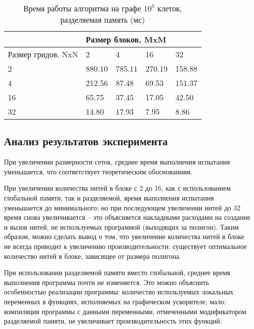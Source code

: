 \documentclass[a4paper, 12pt]{article}
\begin{document}
\clearpage
    \begin{table}[h!]
    \centering
\begin{tabular}{|l|llll|}
\hline
 & \multicolumn{4}{l|}{Размер блоков, MxM} \\ \hline
Размер гридов, NxN & \multicolumn{1}{l|}{2} & \multicolumn{1}{l|}{4} & \multicolumn{1}{l|}{16} & 32 \\ \hline
2 & \multicolumn{1}{l|}{880.10} & \multicolumn{1}{l|}{785.11} & \multicolumn{1}{l|}{270.19} & 158.88 \\ \hline
4 & \multicolumn{1}{l|}{212.56} & \multicolumn{1}{l|}{87.48} & \multicolumn{1}{l|}{69.53} & 151.37 \\ \hline
16 & \multicolumn{1}{l|}{65.75} & \multicolumn{1}{l|}{37.45} & \multicolumn{1}{l|}{17.05} & 42.50 \\ \hline
32 & \multicolumn{1}{l|}{14.80} & \multicolumn{1}{l|}{17.93} & \multicolumn{1}{l|}{7.95} & 8.86 \\ \hline
\end{tabular}
\caption{Время работы алгоритма на графе $10^5$ клеток, разделяемая память (мс)}
\label{tab6}
\end{table}

\subsection{Анализ результатов эксперимента}
При увеличении размерности сеток, среднее время выполнения испытания уменьшается, что соответствует теоретическим обоснованиям. 

При увеличении количества нитей в блоке с 2 до 16, как с использованием глобальной памяти, так и разделяемой, время выполнения испытания уменьшается до минимального; но при последующем увеличении нитей до 32 время снова увеличивается -- это объясняется накладными расходами на создание и вызов нитей, не используемых программой (выходящих за полигон). Таким образом, можно сделать вывод о том, что увеличение количества нитей в блоке не всегда приводит к увеличению производительности; существует оптимальное количество нитей в блоке, зависящее от размера полигона.

При использовании разделяемой памяти вместо глобальной, среднее время выполнения программы почти не изменяется. Это можно объяснить особенностью реализации программы: количество используемых локальных переменных в функциях, исполняемых на графическом ускорителе, мало; компиляция программы с данными переменными, отмеченными модификатором разделяемой памяти, не увеличивает производительность этих функций.
    \clearpage
\end{document}
